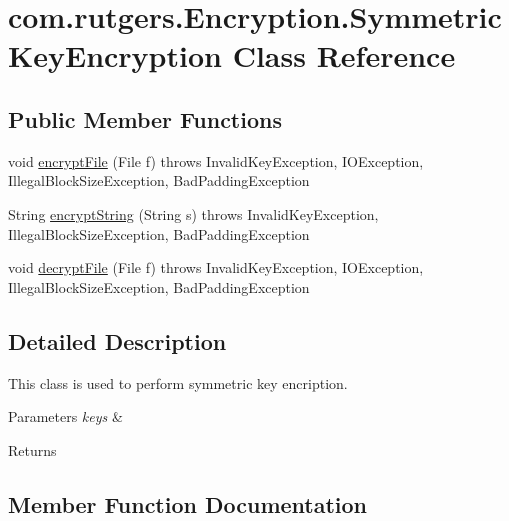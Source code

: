 \hypertarget{classcom_1_1rutgers_1_1Encryption_1_1SymmetricKeyEncryption}{}\section{com.\+rutgers.\+Encryption.\+Symmetric\+Key\+Encryption Class Reference}
\label{classcom_1_1rutgers_1_1Encryption_1_1SymmetricKeyEncryption}
\subsection*{Public Member Functions}
\begin{DoxyCompactItemize}
\item 
void \hyperlink{classcom_1_1rutgers_1_1Encryption_1_1SymmetricKeyEncryption_aac669e7ec3e36281048bdd1c75614e08}{encrypt\+File} (File f)  throws Invalid\+Key\+Exception, I\+O\+Exception, Illegal\+Block\+Size\+Exception, Bad\+Padding\+Exception 
\item 
String \hyperlink{classcom_1_1rutgers_1_1Encryption_1_1SymmetricKeyEncryption_a956b12533ef03a3a947782206cd97323}{encrypt\+String} (String s)  throws Invalid\+Key\+Exception, Illegal\+Block\+Size\+Exception, Bad\+Padding\+Exception 
\item 
void \hyperlink{classcom_1_1rutgers_1_1Encryption_1_1SymmetricKeyEncryption_a8d5b1b7c007f499eaf4a96671a3dcd08}{decrypt\+File} (File f)  throws Invalid\+Key\+Exception, I\+O\+Exception, Illegal\+Block\+Size\+Exception, Bad\+Padding\+Exception 
\end{DoxyCompactItemize}


\subsection{Detailed Description}
This class is used to perform symmetric key encription. 
\begin{DoxyParams}{Parameters}
{\em keys} & \\
\hline
\end{DoxyParams}
\begin{DoxyReturn}{Returns}

\end{DoxyReturn}


\subsection{Member Function Documentation}
\mbox{\label{classcom_1_1rutgers_1_1Encryption_1_1SymmetricKeyEncryption_a8d5b1b7c007f499eaf4a96671a3dcd08}} 
